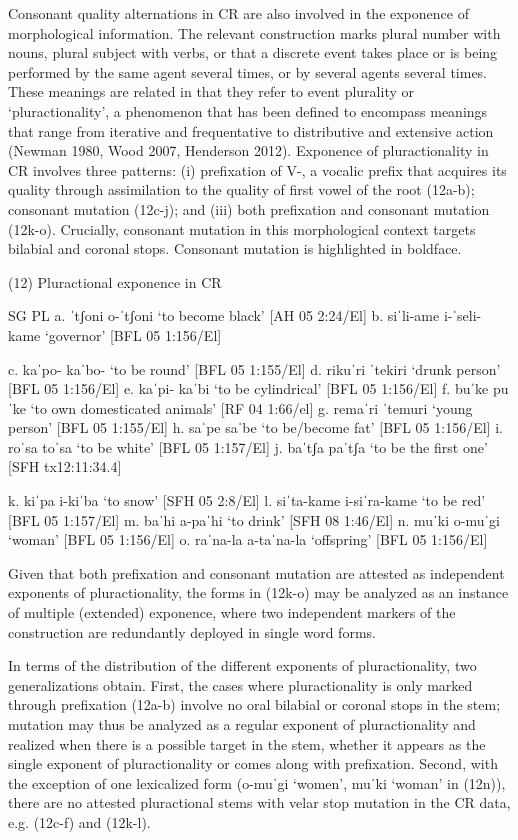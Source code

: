 Consonant quality alternations in CR are also involved in the exponence of morphological information. The relevant construction marks plural number with nouns, plural subject with verbs, or that a discrete event takes place or is being performed by the same agent several times, or by several agents several times. These meanings are related in that they refer to event plurality or ‘pluractionality’, a phenomenon that has been defined to encompass meanings that range from iterative and frequentative to distributive and extensive action (Newman 1980, Wood 2007, Henderson 2012). Exponence of pluractionality in CR involves three patterns: (i) prefixation of V-, a vocalic prefix that acquires its quality through assimilation to the quality of first vowel of the root (12a-b);  consonant mutation (12c-j); and (iii) both prefixation and consonant mutation (12k-o). Crucially, consonant mutation in this morphological context targets bilabial and coronal stops. Consonant mutation is highlighted in boldface.

(12)	Pluractional exponence in CR

	SG			PL
a.	ˈtʃoni 		o-ˈtʃoni 	‘to become black’			[AH 05 2:24/El]
b.	siˈli-ame		i-ˈseli-kame	‘governor’				[BFL 05 1:156/El]

c.	kaˈpo-	 	kaˈbo-		‘to be round’				[BFL 05 1:155/El]
d.	rikuˈri		ˈtekiri		‘drunk person’				[BFL 05 1:156/El]
e.	kaˈpi-		kaˈbi		‘to be cylindrical’			[BFL 05 1:156/El]
f.	buˈke		puˈke		‘to own domesticated animals’		[RF 04 1:66/el]
g.	remaˈri		ˈtemuri		‘young person’				[BFL 05 1:155/El]
h.	saˈpe		saˈbe		‘to be/become fat’			[BFL 05 1:156/El]
i.	roˈsa		toˈsa		‘to be white’				[BFL 05 1:157/El]
j.	baˈtʃa		paˈtʃa		‘to be the first one’			[SFH tx12:11:34.4]

k.	kiˈpa 		i-kiˈba		‘to snow’				[SFH 05 2:8/El]
l.	siˈta-kame 		i-siˈra-kame 	‘to be red’				[BFL 05 1:157/El]
m.	baˈhi 		a-paˈhi		‘to drink’				[SFH 08 1:46/El]
n.	muˈki		o-muˈgi		‘woman’				[BFL 05 1:156/El]
o.	raˈna-la		a-taˈna-la	‘offspring’				[BFL 05 1:156/El]

Given that both prefixation and consonant mutation are attested as independent exponents of pluractionality, the forms in (12k-o) may be analyzed as an instance of multiple (extended) exponence, where two independent markers of the construction are redundantly deployed in single word forms.

In terms of the distribution of the different exponents of pluractionality, two generalizations obtain. First, the cases where pluractionality is only marked through prefixation (12a-b) involve no oral bilabial or coronal stops in the stem; mutation may thus be analyzed as a regular exponent of pluractionality and realized when there is a possible target in the stem, whether it appears as the single exponent of pluractionality or comes along with prefixation. Second, with the exception of one lexicalized form (o-muˈgi ‘women’, muˈki ‘woman’ in (12n)), there are no attested pluractional stems with velar stop mutation in the CR data, e.g. (12c-f) and (12k-l).

